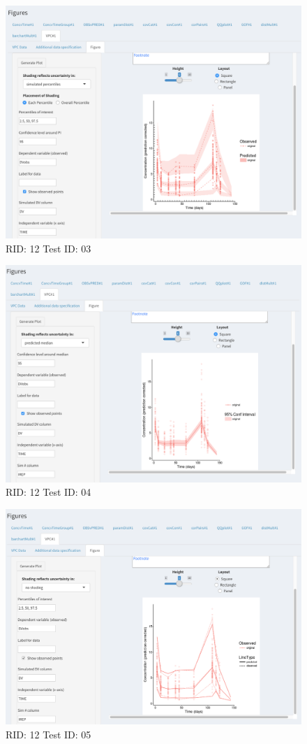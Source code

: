 \begin{figure}[H]
\includegraphics[width=.8\textwidth]{screencaps/12-03-1.png}
\caption{RID: 12 Test ID: 03}
\end{figure}
\begin{figure}[H]
\includegraphics[width=.8\textwidth]{screencaps/12-04-1.png}
\caption{RID: 12 Test ID: 04}
\end{figure}
\begin{figure}[H]
\includegraphics[width=.8\textwidth]{screencaps/12-05-1.png}
\caption{RID: 12 Test ID: 05}
\end{figure}
